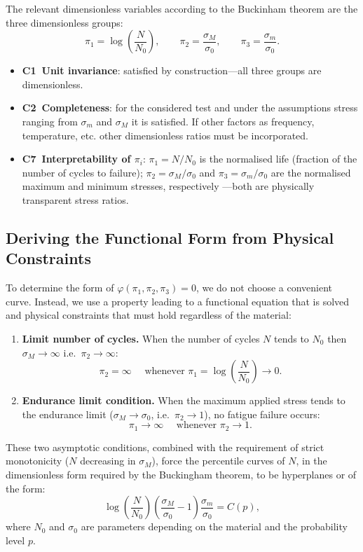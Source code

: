 The relevant dimensionless variables according to the Buckinham theorem are the three dimensionless groups:
\[
  \pi_1 = \log\left(\frac{N}{N_0}\right),
  \qquad
  \pi_2 = \frac{\sigma_M}{\sigma_0},
  \qquad
  \pi_3 = \frac{\sigma_m}{\sigma_0}.
\]

\begin{itemize}[leftmargin=2.5em]
  \item \textbf{C1~Unit invariance}: satisfied by
    construction---all three groups are dimensionless.
  \item \textbf{C2~Completeness}: for the considered test and under the assumptions stress ranging from $\sigma_m$ and $\sigma_M$ it is satisfied. If other factors as frequency, temperature, etc. other dimensionless ratios must be incorporated.
  \item \textbf{C7~Interpretability of $\pi_i$}: $\pi_1 =
    N/N_0$ is the normalised life (fraction
    of the number of cycles to failure); $\pi_2 =
    \sigma_M/\sigma_0$ and $\pi_3 =
    \sigma_m/\sigma_0$ are the normalised maximum and minimum stresses, respectively ---both are
    physically transparent stress ratios.
\end{itemize}

\subsection{Deriving the Functional Form from Physical Constraints}

To determine the form of $\varphi(\pi_1,\pi_2,\pi_3)=0$, we do
not choose a convenient curve.  Instead, we use a property leading to a functional equation that is solved and
physical constraints that must hold regardless of the material:

\begin{enumerate}[label=(\roman*)]
  \item \textbf{Limit number of cycles.} When the number of cycles $N$ tends to $N_0$ then $\sigma_M\to\infty$ i.e.\
    $\pi_2\to\infty$:
    \[
      \pi_2=\infty \quad \text{ whenever } \pi_1=\log\left(\frac{N}{N_0}\right)\to 0.
    \]
  \item \textbf{Endurance limit condition.} When the maximum applied stress tends to the endurance limit ($\sigma_M\to \sigma_0$, i.e.\
    $\pi_2\to 1$), no fatigue failure occurs:
    \[
      \pi_1\to \infty \quad \text{ whenever } \pi_2\to 1.
    \]
\end{enumerate}

These two asymptotic conditions, combined with the requirement of
strict monotonicity ($N$ decreasing in $\sigma_M$), force the
percentile curves of $N$, in the dimensionless form required by the Buckingham theorem, to be hyperplanes or of the form:
\begin{equation}
\log\left(\frac{N}{N_0}\right)\left(\frac{\sigma_M}{\sigma_0}-1\right)\frac{\sigma_m}{\sigma_0}=C(p),
  \label{eq:ucq:sn_physical}
\end{equation}
where $N_0$ and $\sigma_0$ are parameters depending on the material and the probability level $p$.


